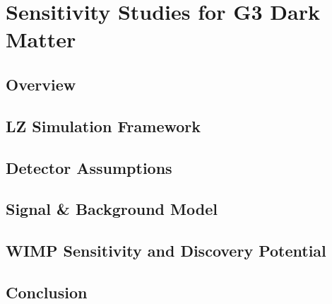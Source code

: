 \chapter{Sensitivity Studies for G3 Dark Matter}
\label{chap:chap6}

\section{Overview}

\section{LZ Simulation Framework}
\label{sec:radon}

\section{Detector Assumptions}
\label{sec:uclradonsystem}

\section{Signal \& Background Model}
\label{sec:uclradon}

\section{WIMP Sensitivity and Discovery Potential}
\label{sec:otherradon}

\section{Conclusion}